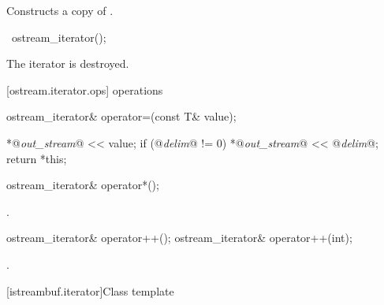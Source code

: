 \begin{itemdescr}
\pnum
\effects
Constructs a copy of .
\end{itemdescr}

%
\begin{itemdecl}
~ostream_iterator();
\end{itemdecl}

\begin{itemdescr}
\pnum
\effects
The iterator is destroyed.
\end{itemdescr}

[ostream.iterator.ops]{ operations}

%
%
\begin{itemdecl}
ostream_iterator& operator=(const T& value);
\end{itemdecl}

\begin{itemdescr}
\pnum
\effects
\begin{codeblock}
*@\textit{out_stream}@ << value;
if (@\textit{delim}@ != 0)
  *@\textit{out_stream}@ << @\textit{delim}@;
return *this;
\end{codeblock}
\end{itemdescr}

%
%
\begin{itemdecl}
ostream_iterator& operator*();
\end{itemdecl}

\begin{itemdescr}
\pnum
\returns
{}.
\end{itemdescr}

%
%
\begin{itemdecl}
ostream_iterator& operator++();
ostream_iterator& operator++(int);
\end{itemdecl}

\begin{itemdescr}
\pnum
\returns
{}.
\end{itemdescr}

[istreambuf.iterator]{Class template }

